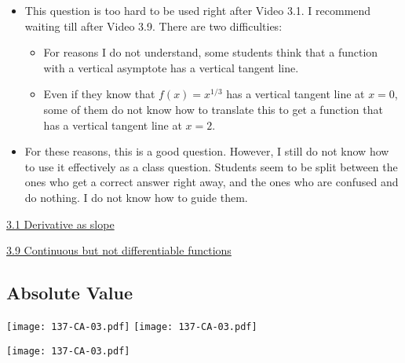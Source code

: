 \documentclass[11pt]{article}
\newcommand {\DS} [1] {${\displaystyle #1}$}
\newcommand{\nl}{\hfill \vspace{-1.1\baselineskip}} %
\newcommand{\vi}{\hspace{8mm} \href{https://www.youtube.com/watch?v=7vhux5TLRmQ&list=PLlwePzQY_wW8qiZD6XYqCnibdY37ygbx7&index=1}{3.1 Derivative as slope}}
\newcommand{\vix}{\hspace{8mm} \href{https://www.youtube.com/watch?v=QBmUyi64zf8&list=PLlwePzQY_wW8qiZD6XYqCnibdY37ygbx7&index=9}{3.9 Continuous but not differentiable functions}}
\begin{document}
\begin{comments}
\nl
	\begin{itemize}
		\item This question is too hard to be used right after Video 3.1.  I recommend waiting till after Video 3.9.		
		There are two difficulties:
			\begin{itemize}
				\item For reasons I do not understand, some students think that a function with a vertical asymptote has a vertical tangent line. 
				\item  Even if they know that \DS{f(x)=x^{1/3}} has a vertical tangent line at $x=0$, some of them do not know how to translate this to get a function that has a vertical tangent line at $x=2$.
			\end{itemize}
		\item For these reasons, this is a good question.  However, I still do not know how to use it effectively as a class question.  Students seem to be split between the ones who get a correct answer right away, and the ones who are confused and do nothing.  I do not know how to guide them.
	\end{itemize}
\end{comments}

\begin{videos}
\vi

\vix
\end{videos}



\newpage

\subsection{Absolute Value} 

\begin{center}
{ \texttt{[image: 137-CA-03.pdf]}} \quad
{ \texttt{[image: 137-CA-03.pdf]}} 

{ \texttt{[image: 137-CA-03.pdf]}} 
\end{center}
\end{document}
